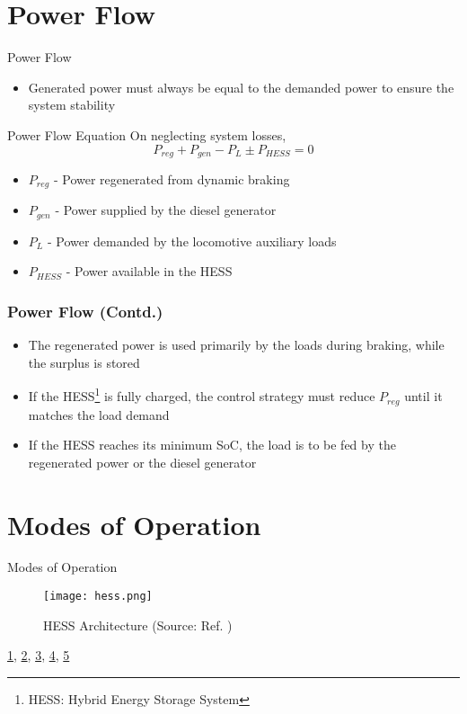 \documentclass[aspectratio=169]{beamer}
\begin{document}
\section{Power Flow}
\begin{frame}{Power Flow}
	
	\begin{itemize}
		\item  Generated power must always be equal
		to the demanded power to ensure the system stability
	\end{itemize} 
\begin{block}{Power Flow Equation}
	\label{Pewer flow}
	On neglecting system losses,
		\begin{equation}
			P_{reg} + P_{gen} - P_{L} \pm P_{HESS} = 0
		\end{equation}
	\begin{itemize}

				\item $P_{reg}$ - Power regenerated from dynamic braking
	\item $P_{gen}$ - Power supplied by the diesel generator
	\item $P_{L}$ -  Power demanded by the locomotive auxiliary loads
	\item $P_{HESS}$ - Power available in the HESS
\end{itemize}	
\end{block}	
	
	
\end{frame}



\begin{frame}
	\frametitle{Power Flow (Contd.)}
	\begin{itemize}
		\item The regenerated
		power is used primarily by the loads during braking, while the
		surplus is stored
		\item If the HESS\footnote{HESS: Hybrid
			Energy Storage System} is fully charged, the control strategy must reduce
		$P_{reg}$ until it matches the load demand
		\item If the HESS reaches its minimum
		SoC, the load is to be fed by the regenerated power
		or the diesel generator
	\end{itemize}
\end{frame}




\section{Modes of Operation}
\begin{frame}{Modes of Operation}
	\label{frame:modes}
	\begin{figure}
		\texttt{[image: hess.png]}
		\caption{HESS Architecture (Source: Ref.  \cite{p1})}
		\label{fig:hess2}
		
	\end{figure}
\hyperlink{frame:mode1}{1}, \hyperlink{frame:mode2}{2}, \hyperlink{frame:mode3}{3}, \hyperlink{frame:mode4}{4}, \hyperlink{frame:mode5}{5}
\end{frame}
\end{document}
